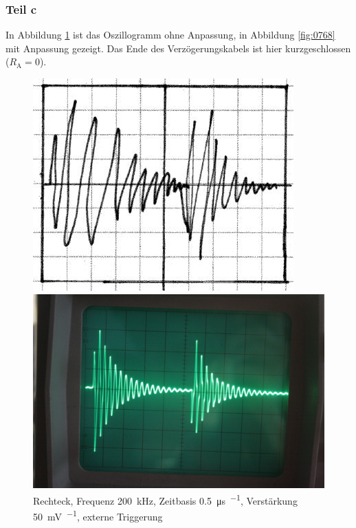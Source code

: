 \FloatBarrier
\subsubsection{Teil c}

In Abbildung \ref{fig:0767} ist das Oszillogramm ohne Anpassung, in Abbildung
\ref{fig:0768} mit Anpassung gezeigt. Das Ende des Verzögerungskabels ist hier kurzgeschlossen ($R_\text{A}=0$).

\begin{figure}[htbp]
	\centering
	\begin{minipage}{.45\linewidth}
	\includegraphics[width=\linewidth]{Skizzen/IMG_0767-1500.jpg}
	\end{minipage}
	\hfill
	\begin{minipage}{.45\linewidth}
	\includegraphics[width=\linewidth]{Fotos/IMG_0767-1500.jpg}
	\end{minipage}
	\caption{%
		Rechteck, Frequenz \SI{200}{\kilo\hertz},
		Zeitbasis \SI{.5}{\micro\second\per\division},
		Verstärkung \SI{50}{\milli\volt\per\division},
		externe Triggerung
	}
	\label{fig:0767}
\end{figure}

